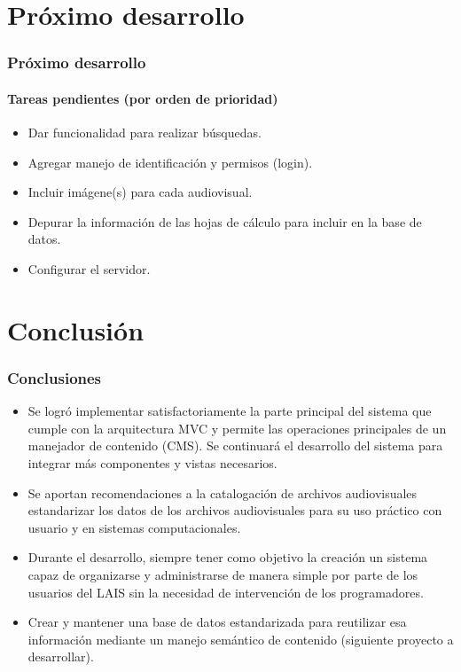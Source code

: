 \documentclass{beamer}
\begin{document}
\section{Próximo desarrollo}
\begin{frame}
	\frametitle{Próximo desarrollo}
	\framesubtitle{Tareas pendientes (por orden de prioridad)}
	\begin{itemize}
		\item Dar funcionalidad para realizar búsquedas.
		\item Agregar manejo de identificación y permisos (login).
		\item Incluir imágene(s) para cada audiovisual.
		\item Depurar la información de las hojas de cálculo para incluir en la base de datos.
		\item Configurar el servidor.
	\end{itemize}
\end{frame}

\section{Conclusión}
\begin{frame}
	\frametitle{Conclusiones}
	\begin{itemize}
		\item Se logró implementar satisfactoriamente la parte principal del sistema que cumple con la arquitectura MVC y permite las operaciones principales de un manejador de contenido (CMS). Se continuará el desarrollo del sistema para integrar más componentes y vistas necesarios.
		\item Se aportan recomendaciones a la catalogación de archivos audiovisuales estandarizar los datos de los archivos audiovisuales para su uso práctico con usuario y en sistemas computacionales.
		\item Durante el desarrollo, siempre tener como objetivo la creación un sistema capaz de organizarse y administrarse de manera simple por parte de los usuarios del LAIS sin la necesidad de intervención de los programadores.
		\item Crear y mantener una base de datos estandarizada para reutilizar esa información mediante un manejo semántico de contenido (siguiente proyecto a desarrollar).
	\end{itemize}
\end{frame}
\end{document}
